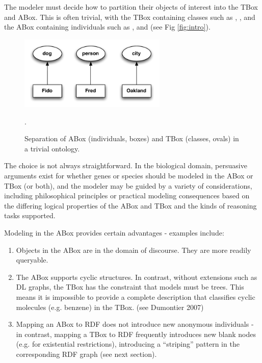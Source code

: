 \documentclass{my}
\begin{document}
The modeler must decide how to partition their objects of interest
into the TBox and ABox. This is often trivial, with the TBox
containing classes such as , ,  and the
ABox containing individuals such as ,  and
 (see Fig \ref{fig:intro}).

\begin{figure}
\center
\includegraphics[width=7cm]{intro}
\caption{Separation of ABox (individuals, boxes) and TBox (classes,
  ovals) in a trivial ontology. }.
\label{fig:into}
\end{figure}


The choice is not always straightforward. In the biological domain,
persuasive arguments exist for whether genes or species should be
modeled in the ABox or TBox (or both), and the modeler may be guided
by a variety of considerations, including philosophical principles or
practical modeling consequences based on the differing logical
properties of the ABox and TBox and the kinds of reasoning tasks
supported.

Modeling in the ABox provides certain advantages - examples include:

\begin{enumerate}

\item Objects in the ABox are in the domain of discourse. They are
  more readily queryable.

\item The ABox supports cyclic structures. In contrast, without
  extensions such as DL graphs, the TBox has the constraint that
  models must be trees. This means it is impossible to provide a
  complete description that classifies cyclic molecules (e.g. benzene)
  in the TBox. (see Dumontier 2007\cite{Dumontier2007})

\item Mapping an ABox to RDF does not introduce new anonymous
  individuals - in contrast, mapping a TBox to RDF frequently
  introduces new blank nodes (e.g. for existential restrictions),
  introducing a ``striping'' pattern in the corresponding RDF graph
  (see next section).

\end{enumerate}
\end{document}
